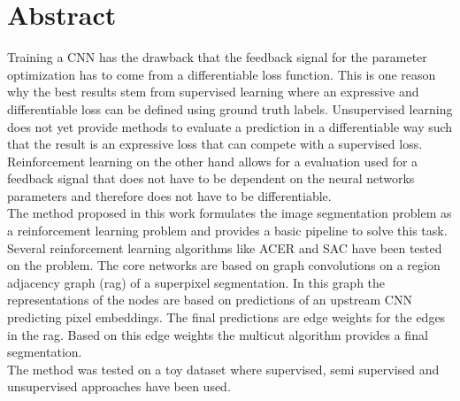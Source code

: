 \section*{Abstract}
Training a CNN has the drawback that the feedback signal for the parameter optimization has to come from a differentiable loss function. This is one reason why the best results stem from supervised learning where an expressive and differentiable loss can be defined using ground truth labels. Unsupervised learning does not yet provide methods to evaluate a prediction in a differentiable way such that the result is an expressive loss that can compete with a supervised loss.\\
Reinforcement learning on the other hand allows for a evaluation used for a feedback signal that does not have to be dependent on the neural networks parameters and therefore does not have to be differentiable.\\
The method proposed in this work formulates the image segmentation problem as a reinforcement learning problem and provides a basic pipeline to solve this task.\\
Several reinforcement learning algorithms like ACER \cite{wang2016sample} and SAC \cite{haarnoja2018soft} have been tested on the problem. The core networks are based on graph convolutions on a region adjacency graph (rag) of a superpixel segmentation. In this graph the representations of the nodes are based on predictions of an upstream CNN predicting pixel embeddings. The final predictions are edge weights for the edges in the rag. Based on this edge weights the multicut algorithm provides a final segmentation.\\
The method was tested on a toy dataset where supervised, semi supervised and unsupervised approaches have been used.